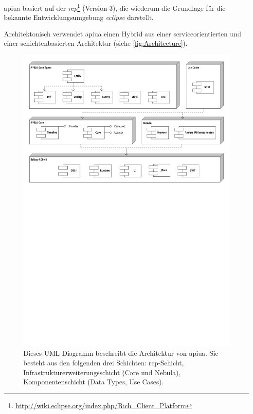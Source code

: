 \Gls{apiua} basiert auf der \textit{\gls{rcp}}\footnote{\url{http://wiki.eclipse.org/index.php/Rich\_Client\_Platform}} (Version 3), die wiederum die Grundlage für die bekannte Entwicklungsumgebung \textit{\gls{eclipse}} darstellt.

Architektonisch verwendet \gls{apiua} einen Hybrid aus einer serviceorientierten und einer schichtenbasierten Architektur (siehe \autoref{fig:Architecture}).

\begin{figure}
  \centering
    \includegraphics[width=1.0\linewidth,trim=0cm 16.5cm 0cm 0cm]{Figures/architecture.pdf}
  \caption[APIUA: Architektur --- Schichten]{Dieses UML-Diagramm beschreibt die Architektur von \gls{apiua}. Sie besteht aus den folgenden drei Schichten: \gls{rcp}-Schicht, Infrastrukturerweiterungsschicht (Core und Nebula),  Komponentenschicht (Data Types, Use Cases).}
  \label{fig:Architecture}
\end{figure}


